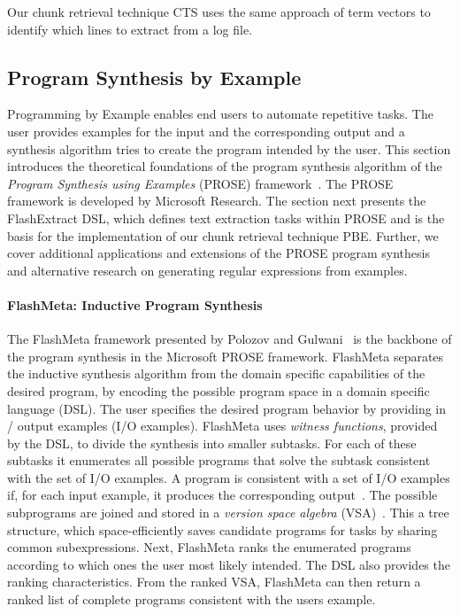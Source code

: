 \documentclass[\myrootdir/main.tex]{subfiles}
\begin{document}
Our chunk retrieval technique CTS uses the same approach of term vectors to identify which lines to extract from a log file.

\subsection{Program Synthesis by Example}
\label{sec:rw-prose}
Programming by Example enables end users to automate repetitive tasks.
The user provides examples for the input and the corresponding output and a synthesis algorithm tries to create the program intended by the user.
This section introduces the theoretical foundations of the program synthesis algorithm of the \emph{Program Synthesis using Examples} (PROSE) framework~\cite{prose2019webpage}.
The PROSE framework is developed by Microsoft Research.
The section next presents the FlashExtract DSL, which defines text extraction tasks within PROSE and is the basis for the implementation of our chunk retrieval technique PBE\@.
Further, we cover additional applications and extensions of the PROSE program synthesis and alternative research on generating regular expressions from examples.

\paragraph{FlashMeta: Inductive Program Synthesis}
The FlashMeta framework presented by Polozov and Gulwani~\cite{polozov2015flashmeta:} is the backbone of the program synthesis in the Microsoft PROSE framework.
FlashMeta separates the inductive synthesis algorithm from the domain specific capabilities of the desired program, by encoding the possible program space in a domain specific language (DSL).
The user specifies the desired program behavior by providing in / output examples (I/O examples).
FlashMeta uses \emph{witness functions}, provided by the DSL, to divide the synthesis into smaller subtasks.
For each of these subtasks it enumerates all possible programs that solve the subtask consistent with the set of I/O examples.
A program is consistent with a set of I/O examples if, for each input example, it produces the corresponding output~\cite{mitchell1982generalization}.
The possible subprograms are joined and stored in a \emph{version space algebra} (VSA)~\cite{mitchell1982generalization}.
This a tree structure, which space-efficiently saves candidate programs for tasks by sharing common subexpressions.
Next, FlashMeta ranks the enumerated programs according to which ones the user most likely intended.
The DSL also provides the ranking characteristics.
From the ranked VSA, FlashMeta can then return a ranked list of complete programs consistent with the users example.
\end{document}
